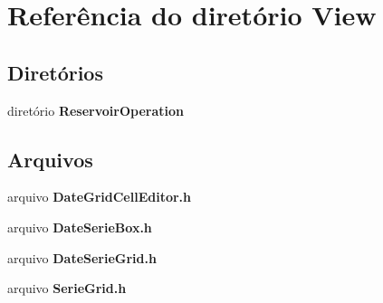 \section{Referência do diretório View}
\label{dir_4bd43993f2082ffe61b96e0db9f34ef1}
\subsection*{Diretórios}
\begin{DoxyCompactItemize}
\item 
diretório {\bf Reservoir\+Operation}
\end{DoxyCompactItemize}
\subsection*{Arquivos}
\begin{DoxyCompactItemize}
\item 
arquivo {\bf Date\+Grid\+Cell\+Editor.\+h}
\item 
arquivo {\bf Date\+Serie\+Box.\+h}
\item 
arquivo {\bf Date\+Serie\+Grid.\+h}
\item 
arquivo {\bf Serie\+Grid.\+h}
\end{DoxyCompactItemize}
